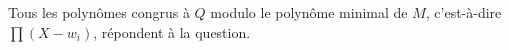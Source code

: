 \begin{enonce}
\begin{solution}
\begin{enumerate}
Tous les polynômes congrus à $Q$ modulo le polynôme minimal de $M$, c'est-à-dire $\prod(X-w_i)$, répondent à la question.
\end{enumerate}
\end{solution}
\end{enonce}

